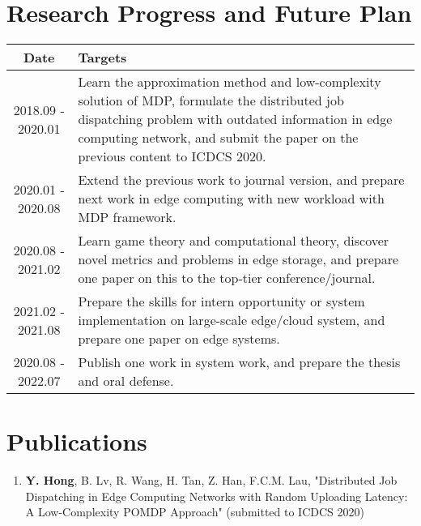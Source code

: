 \section{Research Progress and Future Plan}

\begin{center}
    \begin{tabularx}{0.90\linewidth}{ |c|X| }
        \hline  \textbf{Date}      & \textbf{Targets} \\
        \hline  {2018.09 - 2020.01}  & 
                {Learn the approximation method and low-complexity solution of MDP, formulate the distributed job dispatching problem with outdated information in edge computing network, and submit the paper on the previous content to ICDCS 2020.} \\
        \hline  {2020.01 - 2020.08}  & 
                {Extend the previous work to journal version, and prepare next work in edge computing with new workload with MDP framework.} \\
        \hline  {2020.08 - 2021.02}  & 
                {Learn game theory and computational theory, discover novel metrics and problems in edge storage, and prepare one paper on this to the top-tier conference/journal.} \\
        \hline  {2021.02 - 2021.08}  & 
                {Prepare the skills for intern opportunity or system implementation on large-scale edge/cloud system, and prepare one paper on edge systems.} \\
        \hline  {2020.08 - 2022.07}  & 
                {Publish one work in system work, and prepare the thesis and oral defense.} \\
        \hline
    \end{tabularx}
\end{center}

\section{Publications}
\begin{enumerate}
    \item \textbf{Y. Hong}, {B. Lv}, {R. Wang}, {H. Tan}, {Z. Han}, {F.C.M. Lau}, "Distributed Job Dispatching in Edge Computing Networks with Random Uploading Latency: A Low-Complexity POMDP Approach" (submitted to ICDCS 2020)
\end{enumerate}